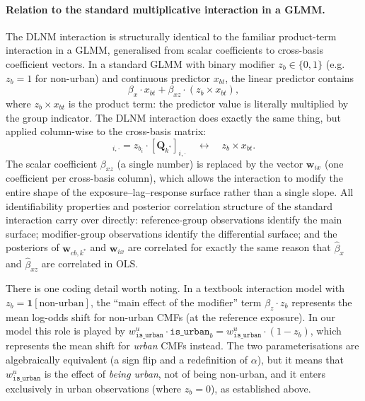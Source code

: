 \documentclass[12pt,a4paper]{article}
\begin{document}
\paragraph{Relation to the standard multiplicative interaction in a GLMM.}
The DLNM interaction is structurally identical to the familiar product-term interaction in a GLMM, generalised from scalar coefficients to cross-basis coefficient vectors. In a standard GLMM with binary modifier $z_b \in \{0,1\}$ (e.g.\ $z_b = 1$ for non-urban) and continuous predictor $x_{bt}$, the linear predictor contains
\begin{equation}
  \beta_x \cdot x_{bt} + \beta_{xz} \cdot (z_b \times x_{bt}),
\end{equation}
where $z_b \times x_{bt}$ is the product term: the predictor value is literally multiplied by the group indicator. The DLNM interaction does exactly the same thing, but applied column-wise to the cross-basis matrix:
\begin{equation}
  [\mathbf{X}_{ix}]_{i,\cdot} = z_{b_i} \cdot [\mathbf{Q}_{k^*}]_{i,\cdot}
  \quad \longleftrightarrow \quad
  z_b \times x_{bt}.
\end{equation}
The scalar coefficient $\beta_{xz}$ (a single number) is replaced by the vector $\mathbf{w}_{ix}$ (one coefficient per cross-basis column), which allows the interaction to modify the entire shape of the exposure--lag--response surface rather than a single slope. All identifiability properties and posterior correlation structure of the standard interaction carry over directly: reference-group observations identify the main surface; modifier-group observations identify the differential surface; and the posteriors of $\mathbf{w}_{cb,k^*}$ and $\mathbf{w}_{ix}$ are correlated for exactly the same reason that $\hat\beta_x$ and $\hat\beta_{xz}$ are correlated in OLS.

There is one coding detail worth noting. In a textbook interaction model with $z_b = \mathbf{1}[\text{non-urban}]$, the ``main effect of the modifier'' term $\beta_z \cdot z_b$ represents the mean log-odds shift for non-urban CMFs (at the reference exposure). In our model this role is played by $w^u_{\texttt{is\_urban}} \cdot \texttt{is\_urban}_b = w^u_{\texttt{is\_urban}} \cdot (1 - z_b)$, which represents the mean shift for \emph{urban} CMFs instead. The two parameterisations are algebraically equivalent (a sign flip and a redefinition of $\alpha$), but it means that $w^u_{\texttt{is\_urban}}$ is the effect of \emph{being urban}, not of being non-urban, and it enters exclusively in urban observations (where $z_b = 0$), as established above.
\end{document}
